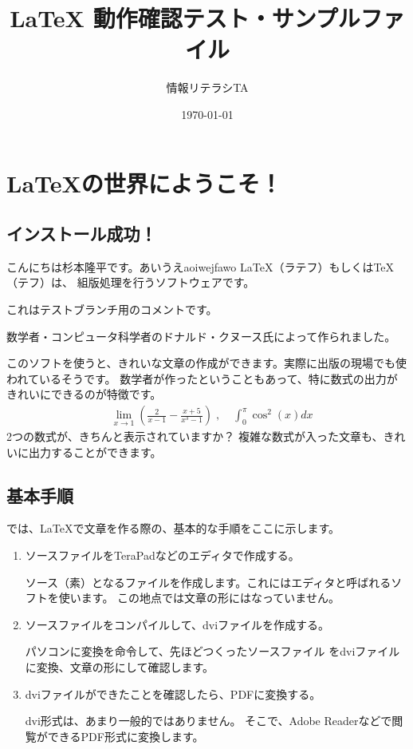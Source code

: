 \documentclass[a4j,12pt]{jreport}
\title{ {\LaTeX} 動作確認テスト・サンプルファイル}
\author{情報リテラシTA}
\date{\today}
\begin{document}
\maketitle


\chapter{\LaTeX の世界にようこそ！}

\section{インストール成功！}
こんにちは杉本隆平です。あいうえaoiwejfawo
\LaTeX（ラテフ）もしくは\TeX（テフ）は、
組版処理を行うソフトウェアです。

これはテストブランチ用のコメントです。


数学者・コンピュータ科学者のドナルド・クヌース氏によって作られました。

このソフトを使うと、きれいな文章の作成ができます。実際に出版の現場でも使われているそうです。
数学者が作ったということもあって、特に数式の出力がきれいにできるのが特徴です。
\begin{eqnarray}
& \displaystyle \lim _{x \rightarrow 1} \left( \frac{2}{x-1} - \frac{x+5}{x^3 -1} \right)\; ,\; 
& \displaystyle \int ^\pi _0 \cos ^2 (x)dx \nonumber
\end{eqnarray}
2つの数式が、きちんと表示されていますか？
複雑な数式が入った文章も、きれいに出力することができます。



\section{基本手順}

では、\LaTeX で文章を作る際の、基本的な手順をここに示します。


\begin{enumerate}
 \item ソースファイルをTeraPadなどのエディタで作成する。
 
 ソース（素）となるファイルを作成します。これにはエディタと呼ばれるソフトを使います。
 この地点では文章の形にはなっていません。
 
 \item ソースファイルをコンパイルして、dviファイルを作成する。
 
 パソコンに変換を命令して、先ほどつくったソースファイル
 をdviファイルに変換、文章の形にして確認します。
 
 \item dviファイルができたことを確認したら、PDFに変換する。
 
 dvi形式は、あまり一般的ではありません。
 そこで、Adobe Readerなどで閲覧ができるPDF形式に変換します。
 
 
\end{enumerate}
\end{document}
